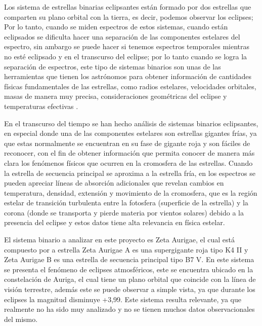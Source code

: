 \documentclass[11pt]{article}
\begin{document}
\noindent Los sistema de estrellas binarias eclipsantes están formado por dos estrellas que comparten su plano orbital con la tierra, es decir, podemos observar los eclipses; Por lo tanto, cuando se miden espectros de estos sistemas, cuando están eclipsados se dificulta hacer una separación de las componentes estelares del espectro, sin ambargo se puede hacer si tenemos espectros temporales mientras no esté eclipsado y en el transcurso del eclipse; por lo tanto cuando se logra la separación de espectros, este tipo de sistemas binarios son unas de las herramientas que tienen los astrónomos para obtener información de cantidades físicas fundamentales de las estrellas, como radios estelares, velocidades orbitales, masas de manera muy precisa, consideraciones geométricas del eclipse y temperaturas efectivas \cite{schroder2009stars}.
\vspace{2mm}

\noindent En el transcurso del tiempo se han hecho análisis de sistemas binarios eclipsantes, en especial donde una de las componentes estelares son estrellas gigantes frías, ya que estas normalmente se encuentran en su fase de gigante roja y son fáciles de reconocer, con el fin de obtener información que permita conocer de manera más clara los fenómenos físicos que ocurren en la cromosfera de las estrellas. Cuando la estrella de secuencia principal se aproxima a la estrella fría, en los espectros se pueden apreciar líneas de absorción adicionales que revelan cambios en temperatura, densidad, extensión y movimiento de la cromosfera, que es la región estelar de transición turbulenta entre la fotosfera (superficie de la estrella) y la corona (donde se transporta y pierde materia por vientos solares) debido a la presencia del eclipse y estos datos tiene alta relevancia en física estelar.

\noindent El sistema binario a analizar en este proyecto es Zeta Aurigae, el cual está compuesto por a estrella Zeta Aurigae A es una supergigante roja tipo K4 II y Zeta Aurigae B es una estrella de secuencia principal tipo B7 V. En este sistema se presenta el fenómeno de eclipses atmosféricos, este se encuentra ubicado en la constelación de Auriga, el cual tiene un plano orbital que coincide con la línea de visión terrestre, además este se puede observar a simple vista, ya que durante los eclipses la magnitud disminuye +3,99. Este sistema resulta relevante, ya que realmente no ha sido muy analizado y no se tienen muchos datos observacionales del mismo.
\vspace{2mm}
\end{document}
